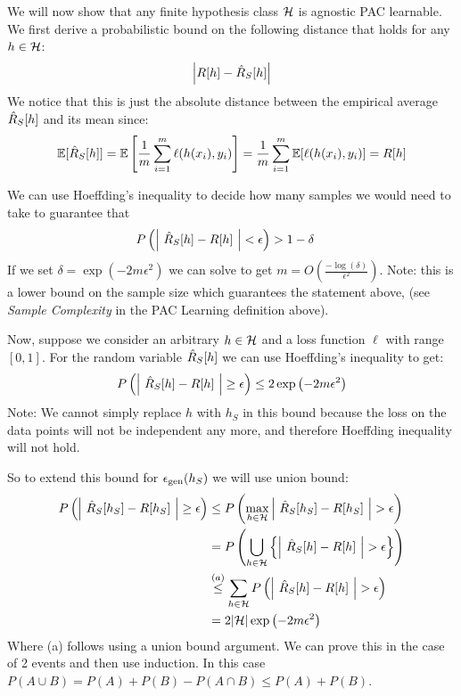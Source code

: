 \documentclass{article}
\begin{document}
We will now show that any finite hypothesis class $\mathcal{H}$ is agnostic PAC learnable. We first derive a probabilistic bound on the following distance that holds for any $h \in \mathcal{H}$:
$$\left|R[h] - \hat{R}_S[h]\right|$$
We notice that this is just the absolute distance between the empirical average $\hat{R}_S[h]$ and its mean since:
\begin{align*}
     \mathbb{E}[\hat{R}_S[h]] = \mathbb{E}\left[\frac{1}{m} \sum_{i = 1}^m \ell(h(x_i), y_i)\right] = \frac{1}{m} \sum_{i = 1}^m \mathbb{E}[\ell(h(x_i), y_i)] = R[h]
\end{align*}


We can use Hoeffding's inequality to decide how many samples we would need to take to guarantee that  
\begin{align*}
    &P\left(\left| \ \hat{R}_S[h] - R[h] \ \right| < \epsilon\right) > 1-\delta
\end{align*}
If we set $\delta = \exp\left(-2 m \epsilon^2\right)$ we can solve to get $m = O\left(\frac{-\log(\delta)}{\epsilon^2}\right)$. Note: this is a lower bound on the sample size which guarantees the statement above, (see \emph{Sample Complexity} in the PAC Learning definition above).

Now, suppose we consider an arbitrary $h\in\mathcal{H}$ and a loss function $\ell$ with range $[0,1]$. For the random variable $\hat{R}_S[h]$ we can use Hoeffding's inequality to get:
\begin{align*}
    P\left( \left| \ \hat{R}_S[h] - R[h] \ \right| \ge \epsilon\right) \le 2 \exp\left(-2 m \epsilon^2\right)
\end{align*}
Note: We cannot simply replace $h$ with $h_S$ in this bound because the loss on the data points will not be independent any more, and therefore Hoeffding inequality will not hold.

So to extend this bound for $\epsilon_{\text{gen}}(h_S)$ we will use union bound:
\begin{align*}
     P\left( \left| \ \hat{R}_S[h_S] - R[h_S] \ \right| \ge \epsilon\right) &\le P\left( \max_{h \in \mathcal{H}} \left| \ \hat{R}_S[h_S] - R[h_S] \ \right| > \epsilon\right) \\
     &= P\left( \bigcup_{h \in \mathcal{H}} \left\{ \left| \ \hat{R}_S[h] - R[h] \ \right| > \epsilon \right\} \right) \\
     &\overset{(a)}{\le} \sum_{h \in \mathcal{H}}  P\left(\left| \ \hat{R}_S[h] - R[h] \ \right| > \epsilon\right)\\
     &=2|\mathcal{H}|\exp\left(-2 m \epsilon^2\right)
\end{align*}
Where (a) follows using a union bound argument. We can prove this in the case of 2 events and then use induction. In this case $P(A \cup B) = P(A) + P(B) - P(A \cap B) \le P(A) + P(B)$.
\end{document}
